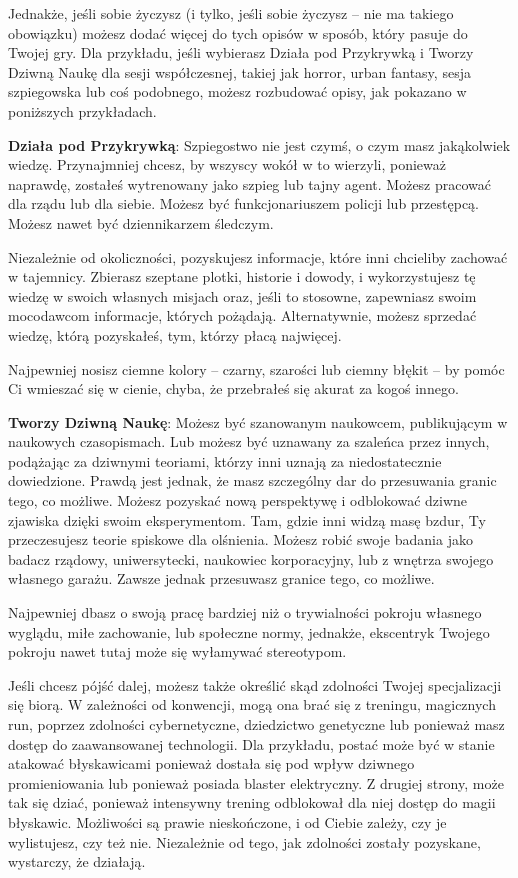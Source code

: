 Jednakże, jeśli sobie życzysz (i tylko, jeśli sobie życzysz – nie ma takiego obowiązku) możesz dodać więcej do tych opisów w sposób, który pasuje do Twojej gry. Dla przykładu, jeśli wybierasz Działa pod Przykrywką i Tworzy Dziwną Naukę dla sesji współczesnej, takiej jak horror, urban fantasy, sesja szpiegowska lub coś podobnego, możesz rozbudować opisy, jak pokazano w poniższych przykładach.

\textbf{Działa pod Przykrywką}: Szpiegostwo nie jest czymś, o czym masz jakąkolwiek wiedzę. Przynajmniej chcesz, by wszyscy wokół w to wierzyli, ponieważ naprawdę, zostałeś wytrenowany jako szpieg lub tajny agent. Możesz pracować dla rządu lub dla siebie. Możesz być funkcjonariuszem policji lub przestępcą. Możesz nawet być dziennikarzem śledczym.

Niezależnie od okoliczności, pozyskujesz informacje, które inni chcieliby zachować w tajemnicy. Zbierasz szeptane plotki, historie i dowody, i wykorzystujesz tę wiedzę w swoich własnych misjach oraz, jeśli to stosowne, zapewniasz swoim mocodawcom informacje, których pożądają. Alternatywnie, możesz sprzedać wiedzę, którą pozyskałeś, tym, którzy płacą najwięcej.

Najpewniej nosisz ciemne kolory – czarny, szarości lub ciemny błękit – by pomóc Ci wmieszać się w cienie, chyba, że przebrałeś się akurat za kogoś innego.

\textbf{Tworzy Dziwną Naukę}: Możesz być szanowanym naukowcem, publikującym w naukowych czasopismach. Lub możesz być uznawany za szaleńca przez innych, podążając za dziwnymi teoriami, którzy inni uznają za niedostatecznie dowiedzione. Prawdą jest jednak, że masz szczególny dar do przesuwania granic tego, co możliwe. Możesz pozyskać nową perspektywę i odblokować dziwne zjawiska dzięki swoim eksperymentom. Tam, gdzie inni widzą masę bzdur, Ty przeczesujesz teorie spiskowe dla olśnienia. Możesz robić swoje badania jako badacz rządowy, uniwersytecki, naukowiec korporacyjny, lub z wnętrza swojego własnego garażu. Zawsze jednak przesuwasz granice tego, co możliwe. 

Najpewniej dbasz o swoją pracę bardziej niż o trywialności pokroju własnego wyglądu, miłe zachowanie, lub społeczne normy, jednakże, ekscentryk Twojego pokroju nawet tutaj może się wyłamywać stereotypom. 

Jeśli chcesz pójść dalej, możesz także określić skąd zdolności Twojej specjalizacji się biorą. W zależności od konwencji, mogą ona brać się z treningu, magicznych run, poprzez zdolności cybernetyczne, dziedzictwo genetyczne lub ponieważ masz dostęp do zaawansowanej technologii. Dla przykładu, postać może być w stanie atakować błyskawicami ponieważ dostała się pod wpływ dziwnego promieniowania lub ponieważ posiada blaster elektryczny. Z drugiej strony, może tak się dziać, ponieważ intensywny trening odblokował dla niej dostęp do magii błyskawic. Możliwości są prawie nieskończone, i od Ciebie zależy, czy je wylistujesz, czy też nie.  Niezależnie od tego, jak zdolności zostały pozyskane, wystarczy, że działają.

